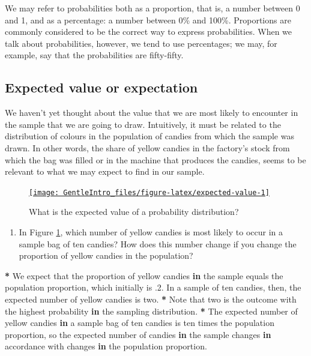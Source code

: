 \documentclass[a4paper]{book}
\newenvironment{Shaded}{\begin{snugshade}}{\end{snugshade}}
\newcommand{\DecValTok}[1]{\textcolor[rgb]{0.00,0.00,0.00}{#1}}
\newcommand{\StringTok}[1]{\textcolor[rgb]{0.00,0.00,0.00}{#1}}
\newcommand{\ControlFlowTok}[1]{\textcolor[rgb]{0.00,0.00,0.00}{\textbf{#1}}}
\newcommand{\OperatorTok}[1]{\textcolor[rgb]{0.00,0.00,0.00}{\textbf{#1}}}
\newcommand{\NormalTok}[1]{#1}
\providecommand{\tightlist}{%
  \setlength{\itemsep}{0pt}\setlength{\parskip}{0pt}}
\theoremstyle{definition}
\theoremstyle{definition}
\theoremstyle{definition}
\theoremstyle{remark}
\begin{document}
We may refer to probabilities both as a proportion, that is, a number
between 0 and 1, and as a percentage: a number between 0\% and 100\%.
Proportions are commonly considered to be the correct way to express
probabilities. When we talk about probabilities, however, we tend to use
percentages; we may, for example, say that the probabilities are
fifty-fifty.

\subsection{Expected value or expectation}\label{expectedvalue}

We haven't yet thought about the value that we are most likely to
encounter in the sample that we are going to draw. Intuitively, it must
be related to the distribution of colours in the population of candies
from which the sample was drawn. In other words, the share of yellow
candies in the factory's stock from which the bag was filled or in the
machine that produces the candies, seems to be relevant to what we may
expect to find in our sample.

\begin{figure}[H]
\href{http://82.196.4.233:3838/apps/expected-value/}{\texttt{[image: GentleIntro\_files/figure-latex/expected-value-1]} }\caption{What is the expected value of a probability distribution?}\label{fig:expected-value}
\end{figure}

\begin{enumerate}
\def\labelenumi{\arabic{enumi}.}
\tightlist
\item
  In Figure \ref{fig:expected-value}, which number of yellow candies is
  most likely to occur in a sample bag of ten candies? How does this
  number change if you change the proportion of yellow candies in the
  population?
\end{enumerate}

\begin{Shaded}
\begin{Highlighting}[]
\OperatorTok{*}\StringTok{ }\NormalTok{We expect that the proportion of yellow candies }\ControlFlowTok{in}\NormalTok{ the sample equals the}
\NormalTok{population proportion, which initially is .}\DecValTok{2}\NormalTok{. In a sample of ten candies,}
\NormalTok{then, the expected number of yellow candies is two.}
\OperatorTok{*}\StringTok{ }\NormalTok{Note that two is the outcome with the highest probability }\ControlFlowTok{in}\NormalTok{ the sampling}
\NormalTok{distribution.}
\OperatorTok{*}\StringTok{ }\NormalTok{The expected number of yellow candies }\ControlFlowTok{in}\NormalTok{ a sample bag of ten candies is ten}
\NormalTok{times the population proportion, so the expected number of candies }\ControlFlowTok{in}\NormalTok{ the}
\NormalTok{sample changes }\ControlFlowTok{in}\NormalTok{ accordance with changes }\ControlFlowTok{in}\NormalTok{ the population proportion.}
\end{Highlighting}
\end{Shaded}
\end{document}
